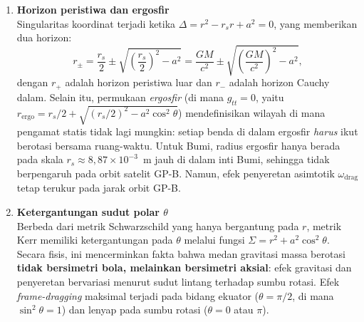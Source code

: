 \begin{enumerate}[label=(\alph*), wide=0pt, leftmargin=*]
    \item \textbf{Horizon peristiwa dan ergosfir}\\
    Singularitas koordinat terjadi ketika $\Delta = r^2 - r_s r + a^2 = 0$, yang memberikan dua horizon:
    \begin{equation}
        r_\pm = \frac{r_s}{2} \pm \sqrt{\left(\frac{r_s}{2}\right)^2 - a^2} = \frac{GM}{c^2} \pm \sqrt{\left(\frac{GM}{c^2}\right)^2 - a^2},
        \label{eq:kerr-horizons}
    \end{equation}
    dengan $r_+$ adalah horizon peristiwa luar dan $r_-$ adalah horizon Cauchy dalam. Selain itu, permukaan \textit{ergosfir} (di mana $g_{tt} = 0$, yaitu $r_{\text{ergo}} = r_s/2 + \sqrt{(r_s/2)^2 - a^2\cos^2\theta}$) mendefinisikan wilayah di mana pengamat statis tidak lagi mungkin: setiap benda di dalam ergosfir \textit{harus} ikut berotasi bersama ruang-waktu. Untuk Bumi, radius ergosfir hanya berada pada skala $r_s \approx 8{,}87 \times 10^{-3}$~m jauh di dalam inti Bumi, sehingga tidak berpengaruh pada orbit satelit GP-B. Namun, efek penyeretan asimtotik $\omega_{\text{drag}}$ tetap terukur pada jarak orbit GP-B.

    \item \textbf{Ketergantungan sudut polar $\theta$}\\
    Berbeda dari metrik Schwarzschild yang hanya bergantung pada $r$, metrik Kerr memiliki ketergantungan pada $\theta$ melalui fungsi $\Sigma = r^2 + a^2\cos^2\theta$. Secara fisis, ini mencerminkan fakta bahwa medan gravitasi massa berotasi \textbf{tidak bersimetri bola, melainkan bersimetri aksial}: efek gravitasi dan penyeretan bervariasi menurut sudut lintang terhadap sumbu rotasi. Efek \textit{frame-dragging} maksimal terjadi pada bidang ekuator ($\theta = \pi/2$, di mana $\sin^2\theta = 1$) dan lenyap pada sumbu rotasi ($\theta = 0$ atau $\pi$).
\end{enumerate}

